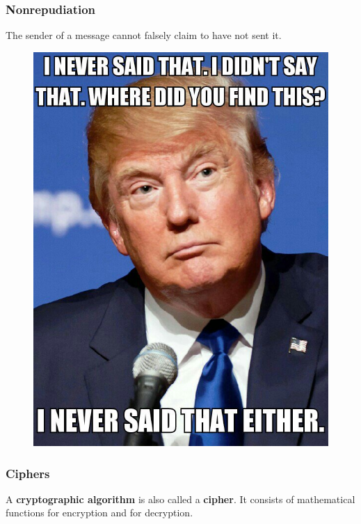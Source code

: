 \documentclass{beamer}
\newcommand{\<}{\langle}
\renewcommand{\>}{\rangle}
\begin{document}
\begin{frame}
\frametitle{Nonrepudiation}

The sender of a message cannot falsely claim to have not sent it. 

\begin{figure}
\includegraphics[scale=.2]{IMG/nonrep.jpg}
\end{figure}
\end{frame}


\begin{frame}
\frametitle{Ciphers}

A \textbf{cryptographic algorithm} is also called a \textbf{cipher}. It consists of mathematical functions for encryption and for decryption. 
\end{frame}
\end{document}

